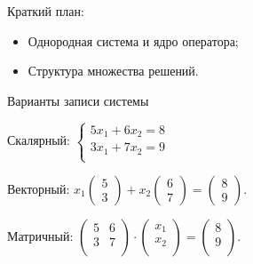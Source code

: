 
\begin{frame} %


\end{frame}



\begin{frame}{Краткий план:}
  \begin{itemize}[<+->]
    \item Однородная система и ядро оператора;
    \item Структура множества решений.
  \end{itemize}

\end{frame}


\begin{frame}{Варианты записи системы}

Скалярный: 
$\begin{cases}
5x_1 + 6x_2 = 8 \\
3x_1 + 7x_2 = 9 \\
\end{cases}$

\pause

Векторный:
$x_1 \begin{pmatrix}
    5 \\
    3 
\end{pmatrix} + 
x_2 \begin{pmatrix}
    6 \\
    7
\end{pmatrix} = 
\begin{pmatrix}
    8 \\
    9
\end{pmatrix}$.
\pause

Матричный:
$\begin{pmatrix}
    5 & 6 \\
    3 & 7 \\
\end{pmatrix} \cdot 
\begin{pmatrix}
    x_1 \\
    x_2 \\
\end{pmatrix} = \begin{pmatrix}
    8 \\
    9 \\
\end{pmatrix}$.


\end{frame}


